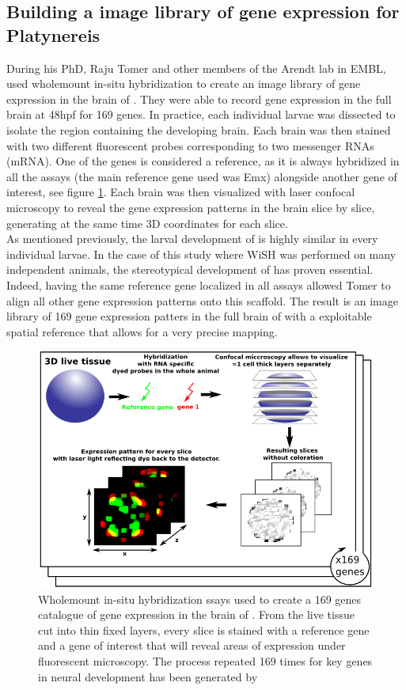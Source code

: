      \subsection{Building a image library of gene expression for Platynereis}
     During his PhD, Raju Tomer and other members of the Arendt lab in EMBL, used wholemount in-situ hybridization to create an image library of gene expression in the brain of \platy{}. They were able to record gene expression in the full brain at 48hpf for 169 genes. In practice, each individual larvae was dissected to isolate the region containing the developing brain. Each brain was then stained with two different fluorescent probes corresponding to two messenger RNAs (mRNA). One of the genes is considered a reference, as it is always hybridized in all the assays (the main reference gene used was Emx) alongside another gene of interest, see figure \ref{fig:insitu}. Each brain was then visualized with laser confocal microscopy to reveal the gene expression patterns in the brain slice by slice, generating at the same time 3D coordinates for each slice.\\
     
     As mentioned previously, the larval development of \platy{} is highly similar in every individual larvae. In the case of this study where WiSH was performed on many independent animals, the stereotypical development of \platy{} has proven essential. Indeed, having the same reference gene localized in all assays allowed Tomer to align all other gene expression patterns onto this scaffold. The result is an image library of 169 gene expression patters in the full brain of \platy{} with a exploitable spatial reference that allows for a very precise mapping.\\
    
    \begin{figure}[bth]
\centerline{\includegraphics[width=0.9\linewidth]{gfx/chapter1/insitu.png}}
\caption{Wholemount in-situ hybridization ssays used to create a 169 genes catalogue of gene expression in the brain of \platy{}. From the live tissue cut into thin fixed layers, every slice is stained with a reference gene and a gene of interest that will reveal areas of expression under fluorescent microscopy. The process repeated 169 times for key genes in \platy{} neural development has been generated by \cite{Tomer10}}\label{fig:insitu}
	\end{figure}
	
